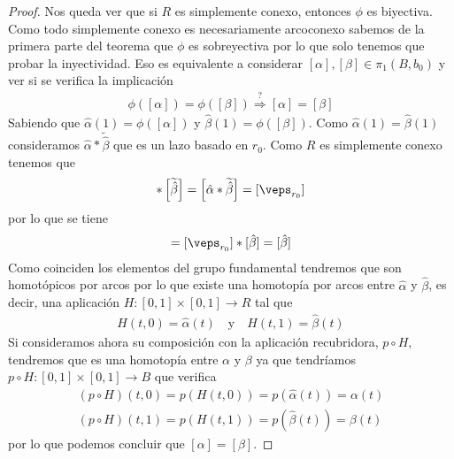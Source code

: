 \begin{teo}
\begin{proof}
        Nos queda ver que si $R$ es simplemente conexo, entonces $\phi$ es biyectiva. Como todo simplemente conexo es necesariamente arcoconexo sabemos de la primera parte del teorema que $\phi$ es sobreyectiva por lo que solo tenemos que probar la inyectividad. Eso es equivalente a considerar $[\alpha],[\beta]\in \pi_1(B,b_0)$ y ver si se verifica la implicación
        \begin{gather*}
             \phi([\alpha]) = \phi([\beta]) \overset{?}{\Rightarrow} [\alpha]=[\beta]
        \end{gather*}
        Sabiendo que $\hat{\alpha}(1) = \phi([\alpha])$ y $\hat{\beta}(1) = \phi([\beta])$. Como $\hat{\alpha}(1)=\hat{\beta}(1)$ consideramos $\hat{\alpha} \ast \tilde{\hat{\beta}}$ que es un lazo basado en $r_0$. Como $R$ es simplemente conexo tenemos que
        \begin{gather*}
            [\hat{\alpha}] \ast \left[\tilde{\hat{\beta}}\right]  = \left[ \hat{\alpha} \ast \tilde{\hat{\beta}} \right] = [\veps_{r_0}]
        \end{gather*}
        por lo que se tiene 
        \begin{gather*}
            [\hat{\alpha}] = [\veps_{r_0}] \ast [\hat{\beta}] = [\hat{\beta}]
        \end{gather*}
        Como coinciden los elementos del grupo fundamental tendremos que son homotópicos por arcos por lo que existe una homotopía por arcos entre $\hat{\alpha}$ y $\hat{\beta}$, es decir, una aplicación $H:[0,1]\times [0,1] \to R$ tal que 
        \begin{gather*}
            H(t,0) = \hat{\alpha}(t) \ \ \ \text{ y } \ \ \ H(t, 1) = \hat{\beta}(t)
        \end{gather*}
        Si consideramos ahora su composición con la aplicación recubridora, $p\circ H$, tendremos que es una homotopía entre $\alpha$ y $\beta$ ya que tendríamos $p\circ H : [0,1] \times [0,1] \to B$ que verifica
        \begin{gather*}
            (p\circ H)(t,0) = p(H(t,0)) = p(\hat{\alpha}(t)) = \alpha(t)\\
            (p\circ H)(t,1) = p(H(t,1)) = p(\hat{\beta}(t)) = \beta(t)
        \end{gather*}
        por lo que podemos concluir que $[\alpha] = [\beta]$.
    \end{proof}
\end{teo}

